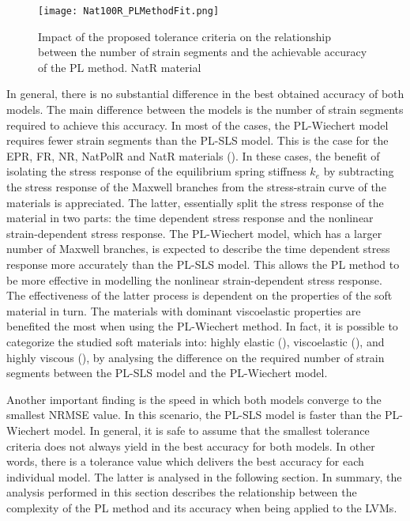 \begin{figure}[H]
	\centering
	\texttt{[image: Nat100R\_PLMethodFit.png]}
	\caption{Impact of the proposed tolerance criteria on the relationship between the number of strain segments and the achievable accuracy of the PL method. NatR material}
	\label{fig:SegmentsNat100R}
\end{figure}

In general, there is no substantial difference in the best obtained accuracy of both models. The main difference between the models is the number of strain segments required to achieve this accuracy. In most of the cases, the PL-Wiechert model requires fewer strain segments than the PL-SLS model. This is the case for the EPR, FR, NR, NatPolR and NatR materials (). In these cases, the benefit of isolating the stress response of the equilibrium spring stiffness $k_e$ by subtracting the stress response of the Maxwell branches from the stress-strain curve of the materials is appreciated. The latter, essentially split the stress response of the material in two parts: the time dependent stress response and the nonlinear strain-dependent stress response. The PL-Wiechert model, which has a larger number of Maxwell branches, is expected to describe the time dependent stress response more accurately than the PL-SLS model. This allows the PL method to be more effective in modelling the nonlinear strain-dependent stress response. The effectiveness of the latter process is dependent on the properties of the soft material in turn. The materials with dominant viscoelastic properties are benefited the most when using the PL-Wiechert method. In fact, it is possible to categorize the studied soft materials into: highly elastic (), viscoelastic (), and highly viscous (), by analysing the difference on the required number of strain segments between the PL-SLS model and the PL-Wiechert model.

Another important finding is the speed in which both models converge to the smallest NRMSE value. In this scenario, the PL-SLS model is faster than the PL-Wiechert model. In general, it is safe to assume that the smallest tolerance criteria does not always yield in the best accuracy for both models. In other words, there is a tolerance value which delivers the best accuracy for each individual model. The latter is analysed in the following section. In summary, the analysis performed in this section describes the relationship between the complexity of the PL method and its accuracy when being applied to the LVMs. 


